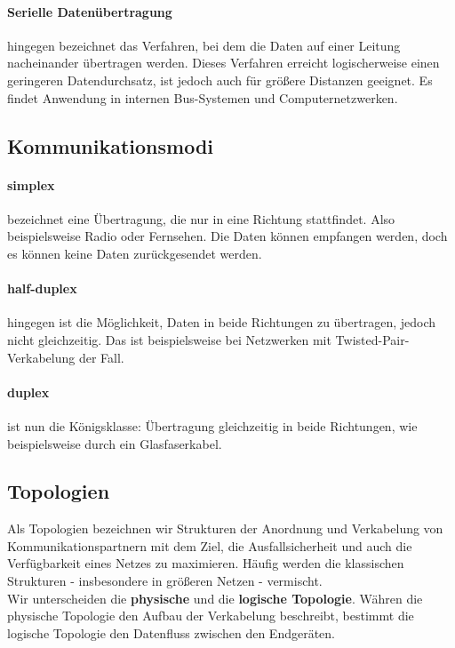 \documentclass[11pt,a4paper]{scrartcl}
\begin{document}
\paragraph{Serielle Datenübertragung} hingegen bezeichnet das Verfahren, bei dem die Daten auf einer Leitung nacheinander übertragen werden. Dieses Verfahren erreicht logischerweise einen geringeren Datendurchsatz, ist jedoch auch für größere Distanzen geeignet. Es findet Anwendung in internen Bus-Systemen und Computernetzwerken.
\subsection{Kommunikationsmodi}
\paragraph{simplex} bezeichnet eine Übertragung, die nur in eine Richtung stattfindet. Also beispielsweise Radio oder Fernsehen. Die Daten können empfangen werden, doch es können keine Daten zurückgesendet werden.
\paragraph{half-duplex} hingegen ist die Möglichkeit, Daten in beide Richtungen zu übertragen, jedoch nicht gleichzeitig. Das ist beispielsweise bei Netzwerken mit Twisted-Pair-Verkabelung der Fall.
\paragraph{duplex} ist nun die Königsklasse: Übertragung gleichzeitig in beide Richtungen, wie beispielsweise durch ein Glasfaserkabel.
\subsection{Topologien} 
Als Topologien bezeichnen wir Strukturen der Anordnung und Verkabelung von Kommunikationspartnern mit dem Ziel, die Ausfallsicherheit und auch die Verfügbarkeit eines Netzes zu maximieren. Häufig werden die klassischen Strukturen - insbesondere in größeren Netzen - vermischt. \\
Wir unterscheiden die \textbf{physische} und die \textbf{logische Topologie}. Währen die physische Topologie den Aufbau der Verkabelung beschreibt, bestimmt die logische Topologie den Datenfluss zwischen den Endgeräten. 
\end{document}
